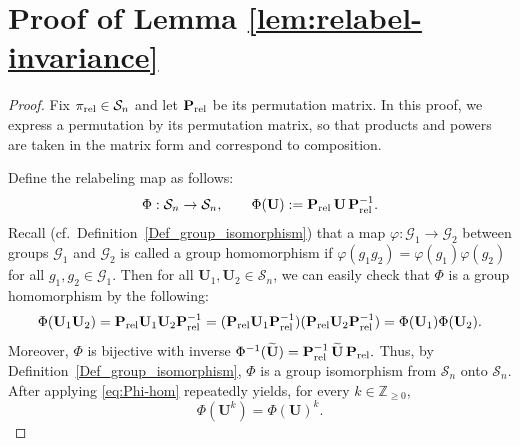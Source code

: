 \documentclass[onecolumn]{IEEEtran} %
\newcommand{\bA}{\mathbf A}
\newcommand{\bP}{\mathbf P}
\newcommand{\bU}{\mathbf U}
\newcommand{\1}{\mathbbm{1}}
\theoremstyle{boldremark}
\begin{document}
\section{Proof of Lemma \ref{lem:relabel-invariance}}\label{APP_proof_lem:relabel-invariance}
\begin{proof}
Fix $\pi_{\rm rel}\in\mathcal{S}_n$ and let $\bP_{\rm rel}$ be its permutation matrix.
In this proof, we express a permutation by its permutation matrix, so that
products and powers are taken in the matrix form and correspond to composition.

Define the relabeling map as follows:
\begin{align}\label{EQ_Phi_R}
    \Phi:\mathcal{S}_n\to\mathcal{S}_n,\qquad \Phi(\bU):= \bP_{\rm rel}\,\bU\,\bP_{\rm rel}^{-1}.    
\end{align}
Recall (cf.\ Definition~\ref{Def_group_isomorphism}) that a map $\varphi:\mathcal{G}_1\to\mathcal{G}_2$ between groups $\mathcal{G}_1$ and $\mathcal{G}_2$ is called a
group homomorphism if $\varphi(g_1g_2)=\varphi(g_1)\varphi(g_2)$ for all
$g_1,g_2\in\mathcal{G}_1$. Then for all $\bU_1,\bU_2\in\mathcal{S}_n$, we can easily check that $\Phi$ is a group homomorphism by the following:
\begin{equation}\label{eq:Phi-hom}
\Phi(\bU_1\bU_2)
=\bP_{\rm rel}\bU_1\bU_2\bP_{\rm rel}^{-1}
=(\bP_{\rm rel}\bU_1\bP_{\rm rel}^{-1})(\bP_{\rm rel}\bU_2\bP_{\rm rel}^{-1})
=\Phi(\bU_1)\Phi(\bU_2).
\end{equation}
Moreover, $\Phi$ is bijective with inverse
$\Phi^{-1}(\widetilde{\bU})=\bP_{\rm rel}^{-1}\,\widetilde{\bU}\,\bP_{\rm rel}.$ Thus, by Definition~\ref{Def_group_isomorphism}, $\Phi$ is a group isomorphism
from $\mathcal{S}_n$ onto $\mathcal{S}_n$. After applying \eqref{eq:Phi-hom} repeatedly yields, for every
$k\in\mathbb{Z}_{\ge 0}$,
\begin{equation}\label{eq:Phi-powers}
\Phi(\bU^k)=\Phi(\bU)^k.
\end{equation}


\end{proof}
\end{document}
